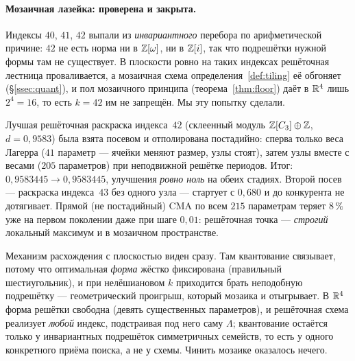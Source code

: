\begin{enumerate}[leftmargin=1.5em]
\paragraph{Мозаичная лазейка: проверена и закрыта.}
Индексы $40$, $41$, $42$ выпали из \emph{инвариантного} перебора по
арифметической причине: $42$ не есть норма ни в $\mathbb{Z}[\omega]$, ни в $\mathbb{Z}[i]$,
так что подрешётки нужной формы там не существует. В плоскости ровно на таких
индексах решёточная лестница проваливается, а мозаичная схема
определения~\ref{def:tiling} её обгоняет (\S\ref{ssec:quant}), и пол
мозаичного принципа (теорема~\ref{thm:floor}) даёт в $\mathbb{R}^4$ лишь $2^4=16$,
то есть $k=42$ им не запрещён. Мы эту попытку сделали.

Лучшая решёточная раскраска индекса~$42$ (склеенный модуль
$\mathbb{Z}[C_3]\oplus\mathbb{Z}$, $d=0{,}9583$) была взята посевом и отполирована
постадийно: сперва только веса Лагерра ($41$ параметр --- ячейки меняют
размер, узлы стоят), затем узлы вместе с весами ($205$ параметров) при
неподвижной решётке периодов. Итог: $0{,}9583445\to0{,}9583445$, улучшения
\emph{ровно ноль} на обеих стадиях. Второй посев --- раскраска индекса~$43$
без одного узла --- стартует с $0{,}680$ и до конкурента не дотягивает.
Прямой (не постадийный) CMA по всем $215$ параметрам теряет $8\,\%$ уже на
первом поколении даже при шаге $0{,}01$: решёточная точка --- \emph{строгий}
локальный максимум и в мозаичном пространстве.

Механизм расхождения с плоскостью виден сразу. Там квантование связывает,
потому что оптимальная \emph{форма} жёстко фиксирована (правильный
шестиугольник), и при нелёшиановом $k$ приходится брать неподобную
подрешётку --- геометрический проигрыш, который мозаика и отыгрывает.
В $\mathbb{R}^4$ форма решётки свободна (девять существенных параметров), и
решёточная схема реализует \emph{любой} индекс, подстраивая под него саму
$\Lambda$; квантование остаётся только у инвариантных подрешёток
симметричных семейств, то есть у одного конкретного приёма поиска, а не у
схемы. Чинить мозаике оказалось нечего.


\end{enumerate}
